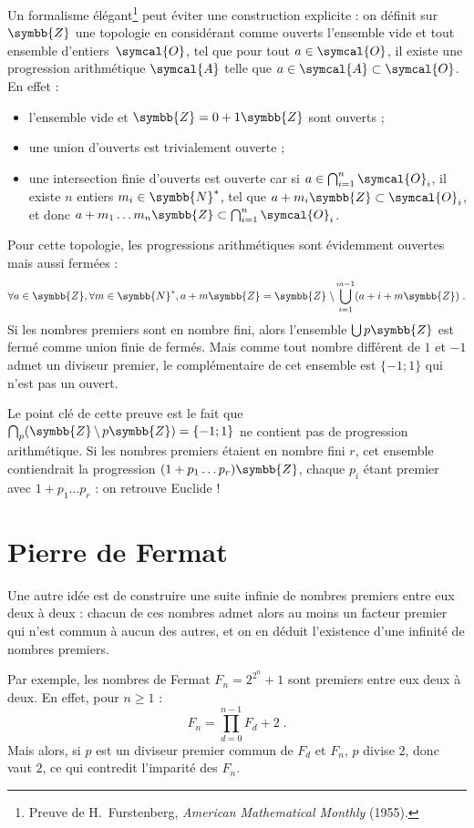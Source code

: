 \documentclass[a4paper,11pt]{article}
\newcommand{\N}{\ensuremath{\symbb{N}}\xspace}
\newcommand{\Z}{\ensuremath{\symbb{Z}}\xspace}
\begin{document}
\medskip
Un formalisme élégant\footnote{
  Preuve de H.~Furstenberg, {\slshape American Mathematical Monthly\/} (1955).}
peut éviter une construction explicite :
on définit sur \Z une topologie en considérant comme ouverts l'ensemble
vide et tout ensemble d'entiers~$\symcal{O}$, tel que pour tout
$a\in\symcal{O}$, il existe une progression arithmétique $\symcal{A}$
telle que $a\in\symcal{A}\subset\symcal{O}$. En effet :
\begin{itemize}
\item l'ensemble vide et $\Z=0+1\Z$ sont ouverts ;
\item une union d'ouverts est trivialement ouverte ;
\item une intersection finie d'ouverts est ouverte car si
  $a\in\bigcap_{i=1}^n \symcal{O}_i$, il existe $n$ entiers $m_i\in\N^*$,
    tel que $a+m_i\Z\subset\symcal{O}_i$,
    et donc $a+m_1\ldots m_n\Z \subset \bigcap_{i=1}^n \symcal{O}_i$.
\end{itemize}
\smallskip
Pour cette topologie, les progressions arithmétiques sont évidemment
ouvertes mais aussi fermées :
\[
  \forall a\in\Z, \forall m\in\N^*,
  a+m\Z = \Z\;\backslash\bigcup_{i=1}^{m-1}(a+i+m\Z) \;.
\]
Si les nombres premiers sont en nombre fini, alors l'ensemble $\bigcup p\Z$
est fermé comme union finie de fermés. Mais comme tout nombre différent de
$1$ et $-1$ admet un diviseur premier, le complémentaire de cet ensemble est
$\{-1; 1\}$ qui n'est pas un ouvert.

Le point clé de cette preuve est le fait que
$\bigcap_p (\Z\,\backslash\,p\Z) = \{-1; 1\}$ ne contient pas de progression
arithmétique. Si les nombres premiers étaient en nombre fini $r$,
cet ensemble contiendrait la progression $(1+p_1\ldots p_r) \Z$, chaque $p_i$
étant premier avec $1+p_1\ldots p_r$ : on retrouve Euclide !

\section{Pierre de Fermat}

Une autre idée est de construire une suite infinie de nombres premiers entre
eux deux à deux : chacun de ces nombres admet alors au moins un facteur
premier qui n'est commun à aucun des autres, et on en déduit l'existence
d'une infinité de nombres premiers.

Par exemple, les nombres de Fermat $F_n=2^{2^n}+1$ sont premiers entre eux
deux à deux. En effet, pour $n\ge 1$ :
\[
  F_n=\prod_{d=0}^{n-1}F_d+2 \;.
\]
Mais alors, si $p$ est un diviseur premier commun de $F_d$ et $F_n$,
$p$ divise $2$, donc vaut $2$, ce qui contredit l'imparité des $F_n$.
\end{document}
